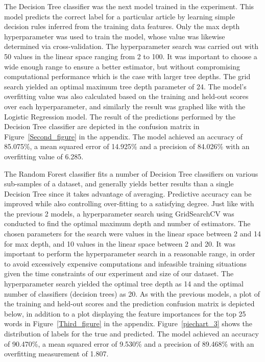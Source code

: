 \documentclass[10pt,twocolumn,letterpaper]{article}
\begin{document}
The Decision Tree classifier was the next model trained in the experiment. This model predicts the correct label for a particular article by learning simple decision rules inferred from the training data features. Only the max depth hyperparameter was used to train the model, whose value was likewise determined via cross-validation. The hyperparameter search was carried out with 50 values in the linear space ranging from 2 to 100. It was important to choose a wide enough range to ensure a better estimator, but without compromising computational performance which is the case with larger tree depths. The grid search yielded an optimal maximum tree depth parameter of 24. The model's overfitting value was also calculated based on the training and held-out scores over each hyperparameter, and similarly the result was graphed like with the Logistic Regression model. The result of the predictions performed by the Decision Tree classifier are depicted in the confusion matrix in Figure~\ref{Second_figure} in the appendix. The model achieved an accuracy of 85.075\%, a mean squared error of 14.925\% and a precision of 84.026\% with an overfitting value of 6.285.\par

The Random Forest classifier fits a number of Decision Tree classifiers on various sub-samples of a dataset, and generally yields better results than a single Decision Tree since it takes advantage of averaging. Predictive accuracy can be improved while also controlling over-fitting to a satisfying degree. Just like with the previous 2 models, a hyperparameter search using GridSearchCV was conducted to find the optimal maximum depth and number of estimators. The chosen parameters for the search were values in the linear space between 2 and 14 for max depth, and 10 values in the linear space between 2 and 20. It was important to perform the hyperparameter search in a reasonable range, in order to avoid excessively expensive computations and infeasible training situations given the time constraints of our experiment and size of our dataset. The hyperparameter search yielded the optimal tree depth as 14 and the optimal number of classifiers (decision trees) as 20. As with the previous models, a plot of the training and held-out scores and the prediction confusion matrix is depicted below, in addition to a plot displaying the feature importances for the top 25 words in Figure~\ref{Third_figure} in the appendix. Figure~\ref{piechart_3} shows the distribution of labels for the true and predicted. The model achieved an accuracy of 90.470\%, a mean squared error of 9.530\% and a precision of 89.468\% with an overfitting measurement of 1.807.\par
\end{document}
